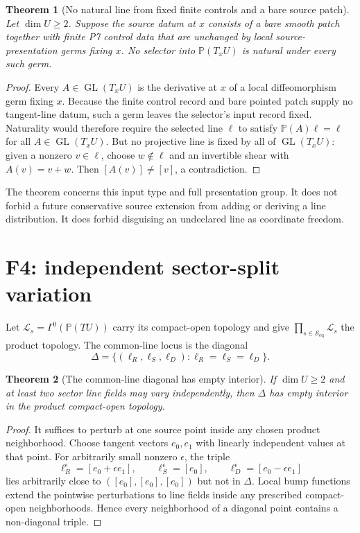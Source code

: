 \documentclass[11pt]{article}
\newtheorem{theorem}{Theorem}
\newcommand{\Seq}{\mathcal S_{\mathrm{eq}}}
\newcommand{\PP}{\mathbb P}
\newcommand{\GL}{\operatorname{GL}}
\begin{document}
\begin{theorem}[No natural line from fixed finite controls and a bare source patch]
\label{thm:no-selector}
Let \(\dim U\ge2\).  Suppose the source datum at \(x\) consists of a bare
smooth patch together with finite P7 control data that are unchanged by local
source-presentation germs fixing \(x\).  No selector into \(\PP(T_xU)\) is
natural under every such germ.
\end{theorem}

\begin{proof}
Every \(A\in\GL(T_xU)\) is the derivative at \(x\) of a local
diffeomorphism germ fixing \(x\).  Because the finite control record and bare
pointed patch supply no tangent-line datum, such a germ leaves the selector's
input record fixed.  Naturality would therefore require the selected line
\(\ell\) to satisfy \(\PP(A)\ell=\ell\) for all
\(A\in\GL(T_xU)\).  But no projective line is fixed by all of \(\GL(T_xU)\):
given a nonzero \(v\in\ell\), choose \(w\notin\ell\) and an invertible shear
with \(A(v)=v+w\).  Then \([A(v)]\ne[v]\), a contradiction.
\end{proof}

The theorem concerns this input type and full presentation group.  It does
not forbid a future conservative source extension from adding or deriving a
line distribution.  It does forbid disguising an undeclared line as
coordinate freedom.

\section{F4: independent sector-split variation}

Let \(\mathcal L_s=\Gamma^0(\PP(TU))\) carry its compact-open topology and
give \(\prod_{s\in\Seq}\mathcal L_s\) the product topology.  The common-line
locus is the diagonal
\[
 \Delta=\{(\ell_R,\ell_S,\ell_D):
                 \ell_R=\ell_S=\ell_D\}.
\]

\begin{theorem}[The common-line diagonal has empty interior]
\label{thm:empty-interior}
If \(\dim U\ge2\) and at least two sector line fields may vary independently,
then \(\Delta\) has empty interior in the product compact-open topology.
\end{theorem}

\begin{proof}
It suffices to perturb at one source point inside any chosen product
neighborhood.  Choose tangent vectors \(e_0,e_1\) with linearly independent
values at that point.  For arbitrarily small nonzero \(\epsilon\), the triple
\[
 \ell_R^\epsilon=[e_0+\epsilon e_1],\qquad
 \ell_S^\epsilon=[e_0],\qquad
 \ell_D^\epsilon=[e_0-\epsilon e_1]
\]
lies arbitrarily close to \(([e_0],[e_0],[e_0])\) but not in \(\Delta\).
Local bump functions extend the pointwise perturbations to line fields inside
any prescribed compact-open neighborhoods.  Hence every neighborhood of a
diagonal point contains a non-diagonal triple.
\end{proof}
\end{document}

